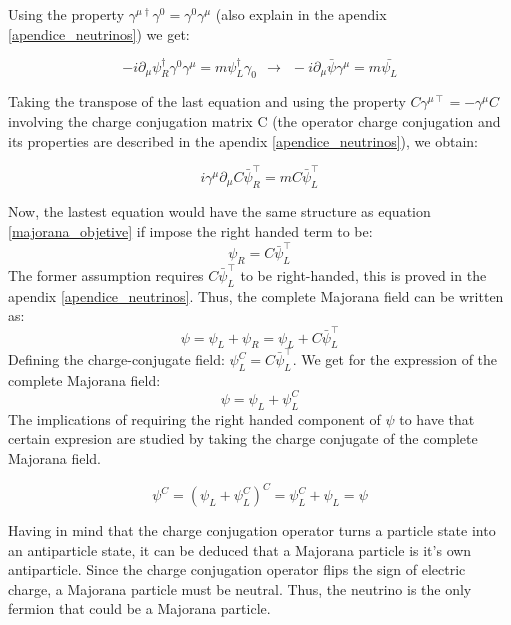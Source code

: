 Using the property $\gamma^{\mu \dagger} \gamma^0 = \gamma^0 \gamma^\mu$ (also explain in the apendix \ref{apendice_neutrinos}) we get:

\begin{equation}
-i \partial_\mu \psi^{\dagger}_R \gamma^0 \gamma^\mu = m \psi^\dagger_L \gamma_0
              \ \ \rightarrow \ \ -i \partial_\mu \bar{\psi}\gamma^\mu = m \bar{\psi_L}
\end{equation}

Taking the transpose of the last equation and using the property $C \gamma^{\mu \intercal} = - \gamma^\mu C$ involving the charge conjugation matrix C (the operator charge conjugation and its properties are described in the apendix \ref{apendice_neutrinos}), we obtain:

\begin{equation}
i \gamma^\mu \partial_\mu C \bar{\psi}^\intercal_R = m C \bar{\psi}^{\intercal}_L
\end{equation}

Now, the lastest equation would have the same structure as equation \ref{majorana_objetive} if impose the right handed term to be:
\begin{equation}
\psi_R = C \bar{\psi}^\intercal_L
\end{equation}
The former assumption requires $C \bar{\psi}^\intercal_L$ to be right-handed, this is proved in the apendix \ref{apendice_neutrinos}. Thus, the complete Majorana field can be written as:
\begin{equation}
\psi = \psi_L + \psi_R = \psi_L + C \bar{\psi}^\intercal_L
\end{equation}
Defining the charge-conjugate field: $\psi^C_L = C \bar{\psi}^\intercal_L$. We get for the expression of the complete Majorana field:
\begin{equation}
\psi = \psi_L + \psi^C_L
\end{equation}
The implications of requiring the right handed component of $\psi$ to have that certain expresion are studied by taking the charge conjugate of the complete Majorana field. 

\begin{equation}
\psi^C = (\psi_L + \psi^C_L)^C = \psi^C_L + \psi_L = \psi
\end{equation}

Having in mind that the charge conjugation operator turns a particle state into an antiparticle state, it can be deduced that a Majorana particle is it's own antiparticle. Since the charge conjugation operator flips the sign of electric charge, a Majorana particle must be neutral. Thus, the neutrino is the only fermion that could be a Majorana particle.

